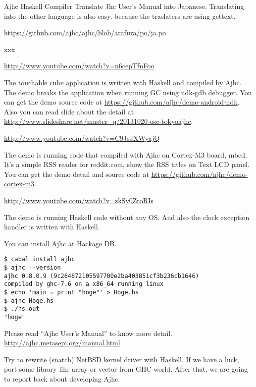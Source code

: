\documentclass[DIV16,twocolumn,10pt]{scrreprt}
\begin{document}
\begin{hcarentry}{Ajhc Haskell Compiler}
Translate Jhc User's Manual into Japanese.
Translating into the other language is also easy, because the traslaters are using gettext.

\noindent \url{https://github.com/ajhc/ajhc/blob/arafura/po/ja.po}

xxx

\Demo

\noindent \url{http://www.youtube.com/watch?v=n6cepTfnFoo}

The touchable cube application is written with Haskell and compiled by Ajhc. The demo breaks the application when running GC using ndk-gdb debugger. You can get the demo source code at \url{https://github.com/ajhc/demo-android-ndk}. Also you can read slide about the detail at \url{http://www.slideshare.net/master\_q/20131020-osc-tokyoajhc}.

\vspace*{10pt}

\noindent \url{http://www.youtube.com/watch?v=C9JsJXWyajQ}

The demo is running code that compiled with Ajhc on Cortex-M3 board, mbed. It's a simple RSS reader for reddit.com, show the RSS titles on Text LCD panel. You can get the demo detail and source code at \url{https://github.com/ajhc/demo-cortex-m3}.

\vspace*{10pt}

\noindent \url{http://www.youtube.com/watch?v=zkSy0ZroRIs}

The demo is running Haskell code without any OS.
And also the clock exception handler is written with Haskell.

\Usage

You can install Ajhc at Hackage DB.

\begin{verbatim}
$ cabal install ajhc
$ ajhc --version
ajhc 0.8.0.9 (9c264872105597700e2ba403851cf3b236cb1646)
compiled by ghc-7.6 on a x86_64 running linux
$ echo 'main = print "hoge"' > Hoge.hs
$ ajhc Hoge.hs
$ ./hs.out
"hoge"
\end{verbatim}

Please read ``Ajhc User's Manual'' to know more detail. \url{http://ajhc.metasepi.org/manual.html}

\FuturePlans

Try to rewrite (snatch) NetBSD kernel driver with Haskell. If we have a luck, port some library like array or vector from GHC world. After that, we are going to report back about developing Ajhc.


\end{hcarentry}
\end{document}
